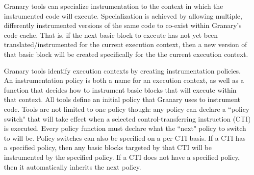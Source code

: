 \documentclass[preprint]{sigplanconf}
\newcommand{\toolname}[1]{{\scshape #1}}
\begin{document}
Granary tools can specialize instrumentation to the context in which the instrumented code will execute. Specialization is achieved by allowing multiple, differently instrumented versions of the same code to co-exist within Granary's code cache. That is, if the next basic block to execute has not yet been translated/instrumented for the current execution context, then a new version of that basic block will be created  specifically for the the current execution context.


Granary tools identify execution contexts by creating instrumentation policies. An instrumentation policy is both a name for an execution context, as well as a function that decides how to instrument basic blocks that will execute within that context. All tools define an initial policy that Granary uses to instrument code. Tools are not limited to one policy though: any policy can declare a ``policy switch" that will take effect when a selected control-transferring instruction (CTI) is executed. Every policy function must declare what the ``next" policy to switch to will be. Policy switches can also be specified on a per-CTI basis. If a CTI has a specified policy, then any basic blocks targeted by that CTI will be instrumented by the specified policy. If a CTI does not have a specified policy, then it automatically inherits the next policy.

\end{document}
